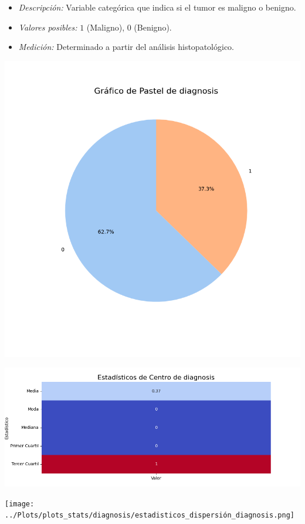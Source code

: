 \documentclass[a4paper, 12pt]{article}
\begin{document}
 \begin{itemize}
	\item \textit{Descripción:} Variable categórica que indica si el tumor es maligno o benigno.
	\item \textit{Valores posibles:}
	$1$ (Maligno), $0$ (Benigno).
	\item \textit{Medición:} Determinado a partir del análisis histopatológico.
\end{itemize}

	\includegraphics[width=\textwidth]{../Plots/plots_stats/diagnosis/grafico_pastel_diagnosis.png}

	\includegraphics[width=\textwidth]{../Plots/plots_stats/diagnosis/estadisticas_centro_diagnosis.png}

	\texttt{[image: ../Plots/plots\_stats/diagnosis/estadisticos\_dispersión\_diagnosis.png]}
\end{document}
